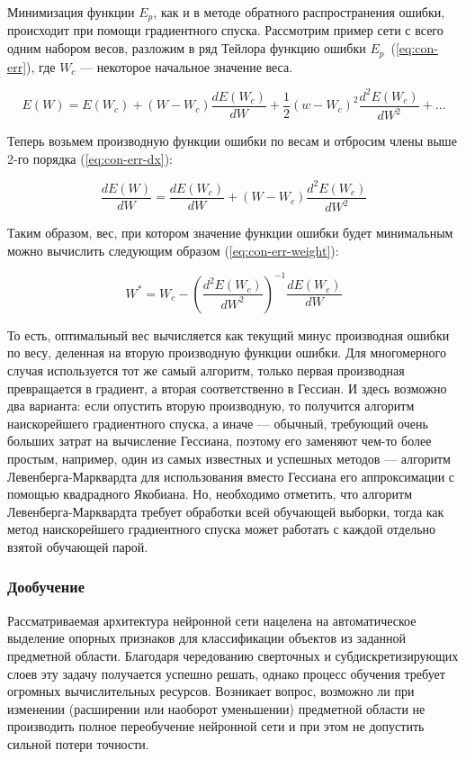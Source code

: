 \documentclass[a4paper,14pt]{extarticle} %
\begin{document}
Минимизация функции $E_p$, как и в методе обратного распространения ошибки, происходит при помощи градиентного спуска. Рассмотрим пример сети с всего одним набором весов, разложим в ряд Тейлора функцию ошибки $E_p$~(\ref{eq:con-err}), где $W_c$ --- некоторое начальное значение веса.

\begin{equation}\label{eq:con-err}
E(W)=E(W_c)+(W-W_c)\frac{dE(W_c)}{dW}+\frac{1}{2}(w-W_c)^2\frac{d^2E(W_c)}{dW^2}+\ldots
\end{equation}

Теперь возьмем производную функции ошибки по весам и отбросим члены выше 2-го порядка (\ref{eq:con-err-dx}):

\begin{equation}\label{eq:con-err-dx}
\frac{dE(W)}{dW}=\frac{dE(W_c)}{dW}+(W-W_c)\frac{d^2E(W_c)}{dW^2}
\end{equation}

Таким образом, вес, при котором значение функции ошибки будет минимальным можно вычислить следующим образом (\ref{eq:con-err-weight}):

\begin{equation}\label{eq:con-err-weight}
W^*=W_c-\left( \frac{d^2E(W_c)}{dW^2} \right)^{-1}\frac{dE(W_c)}{dW}
\end{equation}

То есть, оптимальный вес вычисляется как текущий минус производная ошибки по весу, деленная на вторую производную функции ошибки. Для многомерного случая используется тот же самый алгоритм, только первая производная превращается в градиент, а вторая соответственно в Гессиан. И здесь возможно два варианта: если опустить вторую производную, то получится алгоритм наискорейшего градиентного спуска, а иначе --- обычный, требующий очень больших затрат на вычисление Гессиана, поэтому его заменяют чем-то более простым, например, один из самых известных и успешных методов --- алгоритм Левенберга-Марквардта для использования вместо Гессиана его аппроксимации с помощью квадрадного Якобиана. Но, необходимо отметить, что алгоритм Левенберга-Марквардта требует обработки всей обучающей выборки, тогда как метод наискорейшего градиентного спуска может работать с каждой отдельно взятой обучающей парой. 

\subsubsection{Дообучение}
\hspace{\parindent} Рассматриваемая архитектура нейронной сети нацелена на автоматическое выделение опорных признаков для классификации объектов из заданной предметной области. Благодаря чередованию сверточных и субдискретизирующих слоев эту задачу получается успешно решать, однако процесс обучения требует огромных вычислительных ресурсов. Возникает вопрос, возможно ли при изменении (расширении или наоборот уменьшении) предметной области не производить полное переобучение нейронной сети и при этом не допустить сильной потери точности. 
\end{document}
